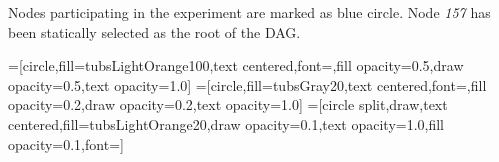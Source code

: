Nodes participating in the experiment are marked as blue circle. Node \emph{157}
has been statically selected as the root of the \ac{DAG}.

=[circle,fill=tubsLightOrange100,text centered,font=\tiny,fill
opacity=0.5,draw opacity=0.5,text opacity=1.0]
=[circle,fill=tubsGray20,text centered,font=\tiny,fill
opacity=0.2,draw opacity=0.2,text opacity=1.0]
=[circle split,draw,text centered,fill=tubsLightOrange20,draw opacity=0.1,text opacity=1.0,fill opacity=0.1,font=\tiny]


\newcommand{\fitnode}[3]{%
  \ifthenelse
  {#3 = 47 \OR #3 = 49 \OR #3 = 51 \OR #3 = 53 \OR #3 = 57 \OR #3 = 59 \OR #3 = 83 \OR #3 = 85 \OR #3 = 87 \OR #3 = 89 \OR #3 = 91 \OR #3 = 93 \OR #3 = 95 \OR #3 = 123 \OR #3 = 127 \OR #3 = 131 \OR #3 = 133 \OR #3 = 151 \OR #3 = 153 \OR #3 = 155 \OR #3 = 157 \OR #3 = 159 \OR #3 = 161 \OR #3 = 192 \OR #3 = 194 \OR #3 = 196 \OR #3 = 198 \OR #3 = 200 \OR #3 = 202 \OR #3 = 204 \OR #3 = 218 \OR #3 = 220 \OR #3 = 222 \OR #3 = 224 \OR #3 = 226 \OR #3 = 228 \OR #3 = 230 \OR #3 = 244 \OR #3 = 246 \OR #3 = 248 \OR #3 = 250 \OR #3 = 252 \OR #3 = 254 \OR #3 = 256}%
  {\node at (#1,#2) [cnode] {#3};}
  {\node at (#1,#2) [snode] {#3};}
}

